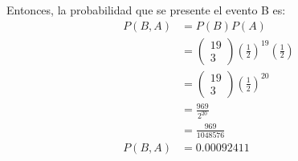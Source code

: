 Entonces, la probabilidad que se presente el evento B es:
\begin{align*}
    P(B,A) & = P(B)P(A)                                                                                    \\
           & =\left(\begin{matrix}
            19 \\
            3
        \end{matrix}\right)\left(\frac{1}{2}\right)^{19} \left(\frac{1}{2}\right) \\
           & =\left(\begin{matrix}
            19 \\
            3
        \end{matrix}\right)\left(\frac{1}{2}\right)^{20}                          \\
           & = \frac{969}{2^20}                                                                            \\
           & = \frac{969}{1048576}                                                                         \\
    P(B,A) & = 0.00092411
\end{align*}

